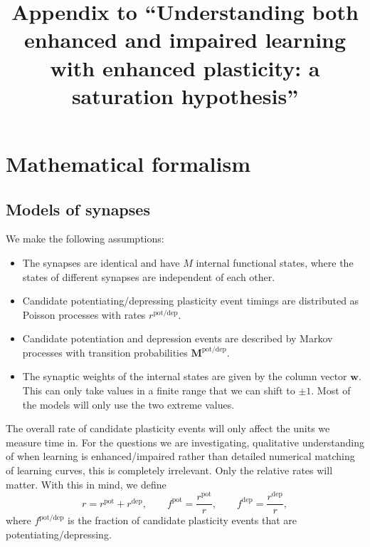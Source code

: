 \documentclass[10pt]{article}
\title{Appendix to ``Understanding both enhanced and impaired learning with enhanced plasticity: a saturation hypothesis''}
\author{}
\date{}
\newcommand{\w}{\mathbf{w}}
\newcommand{\M}{\mathbf{M}}
\newcommand{\pot}{^{\text{pot}}}
\newcommand{\dep}{^{\text{dep}}}
\newcommand{\potdep}{^{\text{pot/dep}}}
\begin{document}
\maketitle







\section{Mathematical formalism}\label{sec:setup}


\subsection{Models of synapses}\label{sec:synapse}

We make the following assumptions:
\begin{itemize}
  \item The synapses are identical and have $M$ internal functional states, where the states of different synapses are independent of each other.
  \item Candidate potentiating/depressing plasticity event timings are distributed as Poisson processes with rates $r\potdep$.
  \item Candidate potentiation and depression events are described by Markov processes with transition probabilities $\M\potdep$.
  \item The synaptic weights of the internal states are given by the column vector $\w$. This can only take values in a finite range that we can shift to $\pm1$. Most of the models will only use the two extreme values.
\end{itemize}

The overall rate of candidate plasticity events will only affect the units we measure time in.
For the questions we are investigating, qualitative understanding of when learning is enhanced/impaired rather than detailed numerical matching of learning curves, this is completely irrelevant.
Only the relative rates will matter.
With this in mind, we define
%
\begin{equation}\label{eq:fpotdep}
  r = r\pot + r\dep,
  \qquad
  f\pot = \frac{r\pot}{r},
  \qquad
  f\dep = \frac{r\dep}{r},
\end{equation}
%
where $f\potdep$ is the fraction of candidate plasticity events that are potentiating/depressing.
\end{document}
